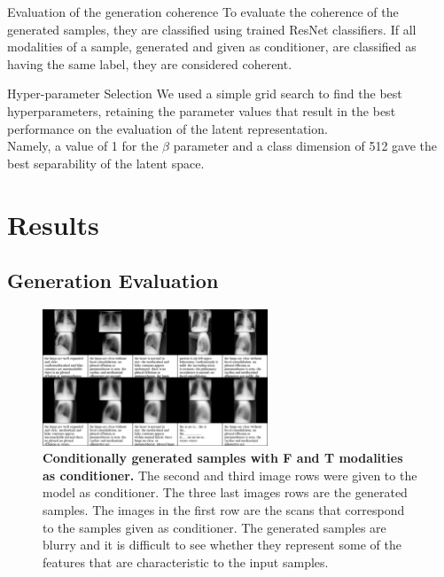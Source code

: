     \begin{frame}{Evaluation of the generation coherence}
        To evaluate the coherence of the generated samples, they are classified using trained ResNet classifiers.
        If all modalities of a sample, generated and given as conditioner, are classified as having the same label, they are considered coherent.
    \end{frame}

    \begin{frame}{Hyper-parameter Selection}
        We used a simple grid search to find the best hyperparameters, retaining the parameter values that result in the best performance on the evaluation of the latent representation.\\
        Namely, a value of 1 for the $\beta$ parameter and a class dimension of 512 gave the best separability of the latent space.
        
    \end{frame}
    
    
    \section{Results}

    \subsection{Generation Evaluation}
    \begin{frame}
        \begin{figure}
            \centering
            \includegraphics[width=0.6\textwidth, height = \textheight, keepaspectratio]{data/cond_gen/Lateral_text}
                \caption{\tiny{
        \textbf{Conditionally generated samples with F and T modalities as conditioner.} The second and third image rows were given to the model as conditioner. The three last images rows are the generated samples. The images in the first row are the scans that correspond to the samples given as conditioner. The generated samples are blurry and it is difficult to see whether they represent some of the features that are characteristic to the input samples.
    }}
        \end{figure}
    \end{frame}

    \printbibliography

